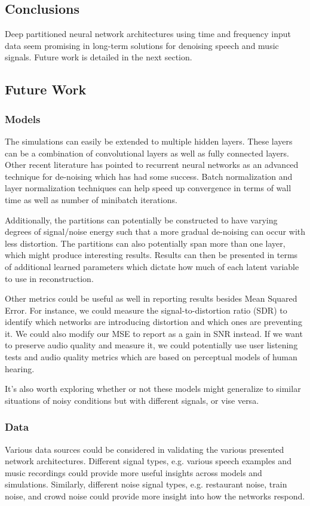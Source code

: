\subsection{Conclusions}
Deep partitioned neural network architectures using time and frequency input data seem promising in long-term solutions for denoising speech and music signals. Future work is detailed in the next section.

\subsection{Future Work}
\subsubsection{Models}
The simulations can easily be extended to multiple hidden layers. These layers can be a combination of convolutional layers as well as fully connected layers. \cite{kayserdenoising} Other recent literature has pointed to recurrent neural networks as an advanced technique for de-noising which has had some success. \cite{graves2014towards} Batch normalization and layer normalization techniques can help speed up convergence in terms of wall time as well as number of minibatch iterations. \cite{2016arXiv160706450L}

Additionally, the partitions can potentially be constructed to have varying degrees of signal/noise energy such that a more gradual de-noising can occur with less distortion. The partitions can also potentially span more than one layer, which might produce interesting results. Results can then be presented in terms of additional learned parameters which dictate how much of each latent variable to use in reconstruction.

Other metrics could be useful as well in reporting results besides Mean Squared Error. For instance, we could measure the signal-to-distortion ratio (SDR) to identify which networks are introducing distortion and which ones are preventing it. We could also modify our MSE to report as a gain in SNR instead. If we want to preserve audio quality and measure it, we could potentially use user listening tests and audio quality metrics which are based on perceptual models of human hearing.

It's also worth exploring whether or not these models might generalize to similar situations of noisy conditions but with different signals, or vise versa.

\subsubsection{Data}
Various data sources could be considered in validating the various presented network architectures. Different signal types, e.g. various speech examples and music recordings could provide more useful insights across models and simulations. Similarly, different noise signal types, e.g. restaurant noise, train noise, and crowd noise could provide more insight into how the networks respond.
